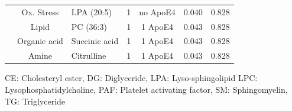 \documentclass{amsart}
\begin{document}
\begin{table}
{\begin{threeparttable}
\begin{tabular}{cclccrr}
   & Ox. Stress & LPA (20:5) & 1 & no ApoE4 & 0.040 & 0.828 \\
   & Lipid & PC (36:3) & 1 & 1 ApoE4 & 0.043 & 0.828 \\
   & Organic acid & Succinic acid & 1 & 1 ApoE4 & 0.043 & 0.828 \\
   & Amine & Citrulline & 1 & 1 ApoE4 & 0.043 & 0.828 \\   \bottomrule  
  \end{tabular}
  \begin{tablenotes}
    \item[] CE: Cholesteryl ester, DG: Diglyceride, LPA: Lyso-sphingolipid LPC: Lysophosphatidylcholine, PAF: Platelet activating factor, SM: Sphingomyelin, TG: Triglyceride
  \end{tablenotes}
\end{threeparttable}}
  \end{table}
\clearpage  
\end{document}
